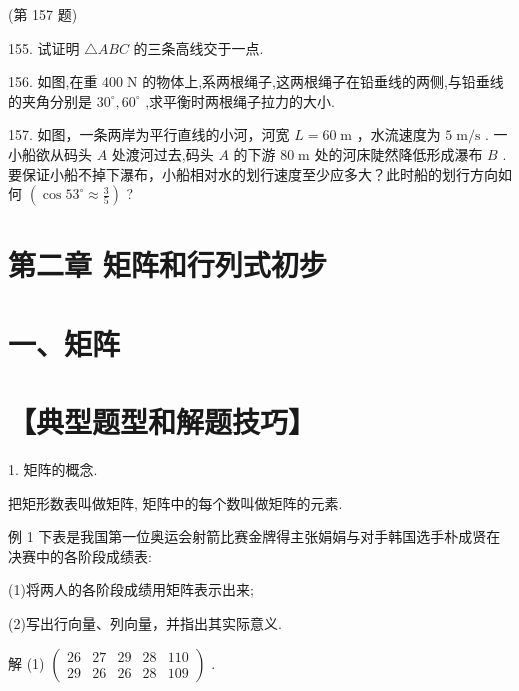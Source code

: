 \documentclass[10pt]{article}
\begin{document}
(第 157 题)

155. 试证明 \(\bigtriangleup {ABC}\) 的三条高线交于一点.

156. 如图,在重 \({400}\mathrm{\;N}\) 的物体上,系两根绳子,这两根绳子在铅垂线的两侧,与铅垂线的夹角分别是 \({30}^{ \circ  },{60}^{ \circ  }\) ,求平衡时两根绳子拉力的大小.

157. 如图，一条两岸为平行直线的小河，河宽 \(L = {60}\mathrm{\;m}\) ，水流速度为 \(5\mathrm{\;m}/\mathrm{s}\) . 一小船欲从码头 \(A\) 处渡河过去,码头 \(A\) 的下游 \({80}\mathrm{\;m}\) 处的河床陡然降低形成瀑布 \(B\) . 要保证小船不掉下瀑布，小船相对水的划行速度至少应多大？此时船的划行方向如何 \(\left( {\cos {53}^{ \circ  } \approx  \frac{3}{5}}\right)\) ?

\section*{第二章 矩阵和行列式初步}

\section*{一、矩阵}

\section*{【典型题型和解题技巧】}

1. 矩阵的概念.

把矩形数表叫做矩阵, 矩阵中的每个数叫做矩阵的元素.

例 1 下表是我国第一位奥运会射箭比赛金牌得主张娟娟与对手韩国选手朴成贤在决赛中的各阶段成绩表:

\begin{center}
\end{center}

(1)将两人的各阶段成绩用矩阵表示出来;

(2)写出行向量、列向量，并指出其实际意义.

解 (1) \(\left( \begin{matrix} {26} & {27} & {29} & {28} & {110} \\  {29} & {26} & {26} & {28} & {109} \end{matrix}\right)\) .
\end{document}
